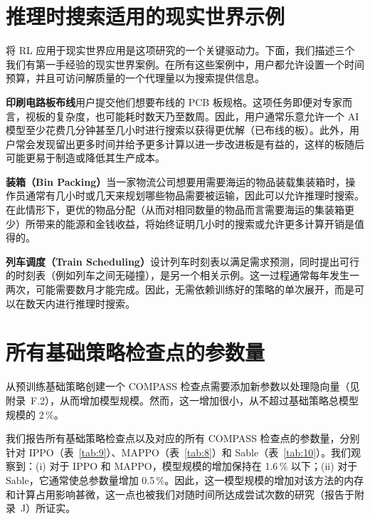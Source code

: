 \documentclass[11pt,UTF8,fontset=fandol]{ctexart}
\begin{document}
\section{推理时搜索适用的现实世界示例}

将 RL 应用于现实世界应用是这项研究的一个关键驱动力。下面，我们描述三个我们有第一手经验的现实世界案例。在所有这些案例中，用户都允许设置一个时间预算，并且可访问解质量的一个代理量以为搜索提供信息。

\textbf{印刷电路板布线}\quad 用户提交他们想要布线的 PCB 板规格。这项任务即便对专家而言，视板的复杂度，也可能耗时数天乃至数周。因此，用户通常乐意允许一个 AI 模型至少花费几分钟甚至几小时进行搜索以获得更优解（已布线的板）。此外，用户常会发现留出更多时间并给予更多计算以进一步改进板是有益的，这样的板随后可能更易于制造或降低其生产成本。

\textbf{装箱（Bin Packing）}\quad 当一家物流公司想要用需要海运的物品装载集装箱时，操作员通常有几小时或几天来规划哪些物品需要被运输，因此可以允许推理时搜索。在此情形下，更优的物品分配（从而对相同数量的物品而言需要海运的集装箱更少）所带来的能源和金钱收益，将始终证明几小时的搜索或允许更多计算开销是值得的。

\textbf{列车调度（Train Scheduling）}\quad 设计列车时刻表以满足需求预测，同时提出可行的时刻表（例如列车之间无碰撞），是另一个相关示例。这一过程通常每年发生一两次，可能需要数月才能完成。因此，无需依赖训练好的策略的单次展开，而是可以在数天内进行推理时搜索。

\section{所有基础策略检查点的参数量}

从预训练基础策略创建一个 COMPASS 检查点需要添加新参数以处理隐向量（见附录~F.2），从而增加模型规模。然而，这一增加很小，从不超过基础策略总模型规模的 2\,\%。

我们报告所有基础策略检查点以及对应的所有 COMPASS 检查点的参数量，分别针对 IPPO（表~\ref{tab:9}）、MAPPO（表~\ref{tab:8}）和 Sable（表~\ref{tab:10}）。我们观察到：(i) 对于 IPPO 和 MAPPO，模型规模的增加保持在 1.6\,\% 以下；(ii) 对于 Sable，它通常使总参数量增加 0.5\,\%。因此，这一模型规模的增加对该方法的内存和计算占用影响甚微，这一点也被我们对随时间所达成尝试次数的研究（报告于附录~J）所证实。
\end{document}
